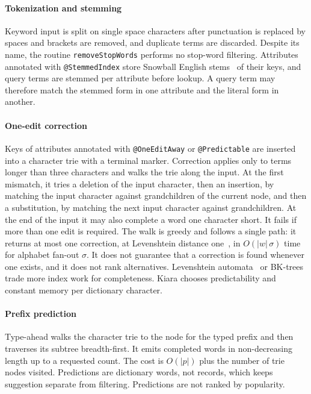 \paragraph*{Tokenization and stemming}
Keyword input is split on single space characters after punctuation is replaced by spaces and brackets are removed, and duplicate terms are discarded. Despite its name, the routine \texttt{removeStopWords} performs no stop-word filtering. Attributes annotated with \texttt{@StemmedIndex} store Snowball English stems~\cite{porter2001snowball} of their keys, and query terms are stemmed per attribute before lookup. A query term may therefore match the stemmed form in one attribute and the literal form in another.

\paragraph*{One-edit correction}
Keys of attributes annotated with \texttt{@OneEditAway} or \texttt{@Predictable} are inserted into a character trie with a terminal marker. Correction applies only to terms longer than three characters and walks the trie along the input. At the first mismatch, it tries a deletion of the input character, then an insertion, by matching the input character against grandchildren of the current node, and then a substitution, by matching the next input character against grandchildren. At the end of the input it may also complete a word one character short. It fails if more than one edit is required. The walk is greedy and follows a single path: it returns at most one correction, at Levenshtein distance one~\cite{levenshtein1966binary}, in $O(|w|\,\sigma)$ time for alphabet fan-out $\sigma$. It does not guarantee that a correction is found whenever one exists, and it does not rank alternatives. Levenshtein automata~\cite{schulz2002fast} or BK-trees~\cite{burkhard1973approaches} trade more index work for completeness. Kiara chooses predictability and constant memory per dictionary character.

\paragraph*{Prefix prediction}
Type-ahead walks the character trie to the node for the typed prefix and then traverses its subtree breadth-first. It emits completed words in non-decreasing length up to a requested count. The cost is $O(|p|)$ plus the number of trie nodes visited. Predictions are dictionary words, not records, which keeps suggestion separate from filtering. Predictions are not ranked by popularity.


